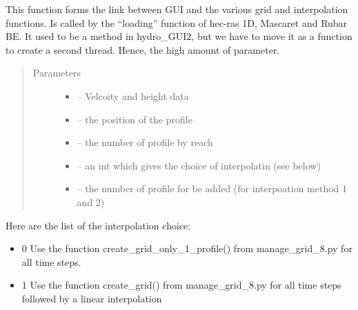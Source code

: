 \documentclass[letterpaper,10pt,english]{sphinxmanual}
\begin{document}

\begin{fulllineitems}
\label{\detokenize{index:src.manage_grid_8.grid_and_interpo}}
This function forms the link between GUI and the various grid and interpolation functions. Is called by
the ``loading'' function of hec-ras 1D, Mascaret and Rubar BE. It used to be a method in hydro\_GUI2, but we have
to move it as a function to create a second thread. Hence, the high amount of parameter.
\begin{quote}\begin{description}
\item[{Parameters}] \leavevmode\begin{itemize}
\item {} 
 -- Velcoity and height data

\item {} 
 -- the position of the profile

\item {} 
 -- the number of profile by reach

\item {} 
 -- an int which gives the choice of interpolatin (see below)

\item {} 
 -- the number of profile for be added (for interpoation method 1 and 2)

\end{itemize}

\end{description}\end{quote}


Here are the list of the interpolation choice:
\begin{itemize}
\item {} 
0 Use the function create\_grid\_only\_1\_profile() from manage\_grid\_8.py for all time steps.

\item {} 
1 Use the function create\_grid() from manage\_grid\_8.py for all time steps followed by a linear interpolation


\end{itemize}
\end{fulllineitems}
\end{document}
